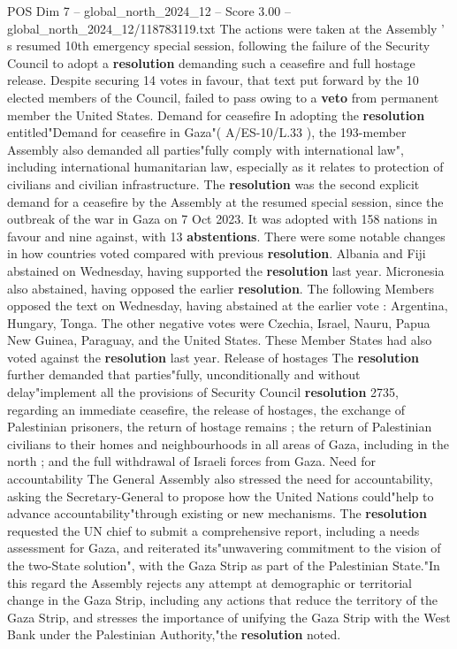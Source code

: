 \begin{textsample}{POS Dim 7 – global\_north\_2024\_12 – Score 3.00 – global\_north\_2024\_12/118783119.txt}  \label{ex:f7_pos_290}
The actions were taken at the Assembly ' s resumed 10th emergency special session, following the failure of the Security Council to adopt a \textbf{resolution} demanding such a ceasefire and full hostage release.
Despite securing 14 votes in favour, that text put forward by the 10 elected members of the Council, failed to pass owing to a \textbf{veto} from permanent member the United States.
Demand for ceasefire In adopting the \textbf{resolution} entitled"Demand for ceasefire in Gaza"( A/ES-10/L.33 ), the 193-member Assembly also demanded all parties"fully comply with international law", including international humanitarian law, especially as it relates to protection of civilians and civilian infrastructure.
The \textbf{resolution} was the second explicit demand for a ceasefire by the Assembly at the resumed special session, since the outbreak of the war in Gaza on 7 Oct 2023.
It was adopted with 158 nations in favour and nine against, with 13 \textbf{abstentions}.
There were some notable changes in how countries voted compared with previous \textbf{resolution}.
Albania and Fiji abstained on Wednesday, having supported the \textbf{resolution} last year.
Micronesia also abstained, having opposed the earlier \textbf{resolution}.
The following Members opposed the text on Wednesday, having abstained at the earlier vote : Argentina, Hungary, Tonga.
The other negative votes were Czechia, Israel, Nauru, Papua New Guinea, Paraguay, and the United States.
These Member States had also voted against the \textbf{resolution} last year.
Release of hostages The \textbf{resolution} further demanded that parties"fully, unconditionally and without delay"implement all the provisions of Security Council \textbf{resolution} 2735, regarding an immediate ceasefire, the release of hostages, the exchange of Palestinian prisoners, the return of hostage remains ; the return of Palestinian civilians to their homes and neighbourhoods in all areas of Gaza, including in the north ; and the full withdrawal of Israeli forces from Gaza.
Need for accountability The General Assembly also stressed the need for accountability, asking the Secretary-General to propose how the United Nations could"help to advance accountability"through existing or new mechanisms.
The \textbf{resolution} requested the UN chief to submit a comprehensive report, including a needs assessment for Gaza, and reiterated its"unwavering commitment to the vision of the two-State solution", with the Gaza Strip as part of the Palestinian State."In this regard the Assembly rejects any attempt at demographic or territorial change in the Gaza Strip, including any actions that reduce the territory of the Gaza Strip, and stresses the importance of unifying the Gaza Strip with the West Bank under the Palestinian Authority,"the \textbf{resolution} noted.

\end{textsample}
